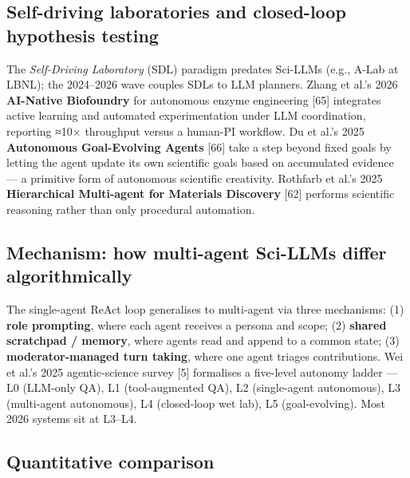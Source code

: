 \subsection{Self-driving laboratories and closed-loop hypothesis testing}\label{self-driving-laboratories-and-closed-loop-hypothesis-testing}

The \emph{Self-Driving Laboratory} (SDL) paradigm predates Sci-LLMs (e.g., A-Lab at LBNL); the 2024--2026 wave couples SDLs to LLM planners. Zhang et al.'s 2026 \textbf{AI-Native Biofoundry} for autonomous enzyme engineering {[}65{]} integrates active learning and automated experimentation under LLM coordination, reporting ≈10× throughput versus a human-PI workflow. Du et al.'s 2025 \textbf{Autonomous Goal-Evolving Agents} {[}66{]} take a step beyond fixed goals by letting the agent update its own scientific goals based on accumulated evidence --- a primitive form of autonomous scientific creativity. Rothfarb et al.'s 2025 \textbf{Hierarchical Multi-agent for Materials Discovery} {[}62{]} performs scientific reasoning rather than only procedural automation.

\subsection{Mechanism: how multi-agent Sci-LLMs differ algorithmically}\label{mechanism-how-multi-agent-sci-llms-differ-algorithmically}

The single-agent ReAct loop generalises to multi-agent via three mechanisms: (1) \textbf{role prompting}, where each agent receives a persona and scope; (2) \textbf{shared scratchpad / memory}, where agents read and append to a common state; (3) \textbf{moderator-managed turn taking}, where one agent triages contributions. Wei et al.'s 2025 agentic-science survey {[}5{]} formalises a five-level autonomy ladder --- L0 (LLM-only QA), L1 (tool-augmented QA), L2 (single-agent autonomous), L3 (multi-agent autonomous), L4 (closed-loop wet lab), L5 (goal-evolving). Most 2026 systems sit at L3--L4.

\subsection{Quantitative comparison}\label{quantitative-comparison}

